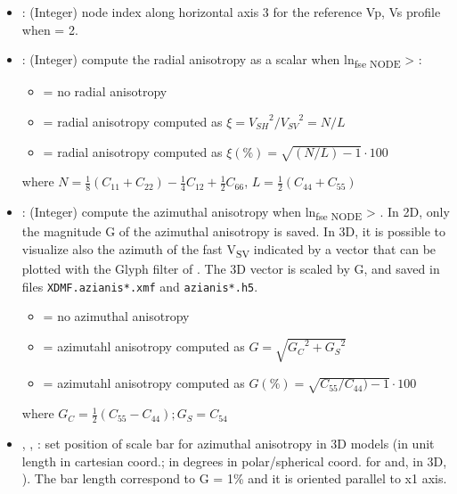 \begin{itemize}
	\item {}: (Integer) node index along horizontal axis 3 for the reference Vp, Vs profile when  = 2.
	
	\item {}: (Integer) compute the radial anisotropy as a scalar when ln\textsubscript{fse NODE} > :

    \begin{itemize}
        \item[]  = no radial anisotropy
        \item[]  = radial anisotropy computed as $\xi={V_{SH}}^2/{V_{SV}}^2=N/L$
        \item[]  = radial anisotropy computed as $\xi(\%)=\sqrt{(N/L)-1}\cdot100$
    \end{itemize}
    where
    $N=\frac{1}{8} (C_{11}+C_{22} )-\frac{1}{4} C_{12}+\frac{1}{2} C_{66}$,
    $L=\frac{1}{2} (C_{44}+C_{55})$
    
	\item {}: (Integer) compute the azimuthal anisotropy when ln\textsubscript{fse NODE} > . In 2D, only the magnitude G of the azimuthal anisotropy is saved. In 3D, it is possible to visualize also the azimuth of the fast V\textsubscript{SV} indicated by a vector that can be plotted with the Glyph filter of \paraviewtitle{}. The 3D vector is scaled by G, and saved in files \texttt{XDMF.azianis*.xmf} and \texttt{azianis*.h5}.

    \begin{itemize}
        \item[]  = no azimuthal anisotropy
        \item[]  = azimutahl anisotropy computed as $G=\sqrt{{G_C}^2+{G_S}^2} $ 
        \item[]  = azimutahl anisotropy computed as $G(\%)=\sqrt{C_{55}/C_{44} )-1}\cdot100$
    \end{itemize}
    where $G_C=\frac{1}{2}(C_{55}-C_{44} )  ; G_S=C_{54}$
	
	\item {}, , : set position of scale bar for azimuthal anisotropy in 3D models (in unit length in cartesian coord.; in degrees in polar/spherical coord. for  and, in 3D, ). The bar length correspond to G = 1\% and it is oriented parallel to x1 axis. 
	

\end{itemize}

